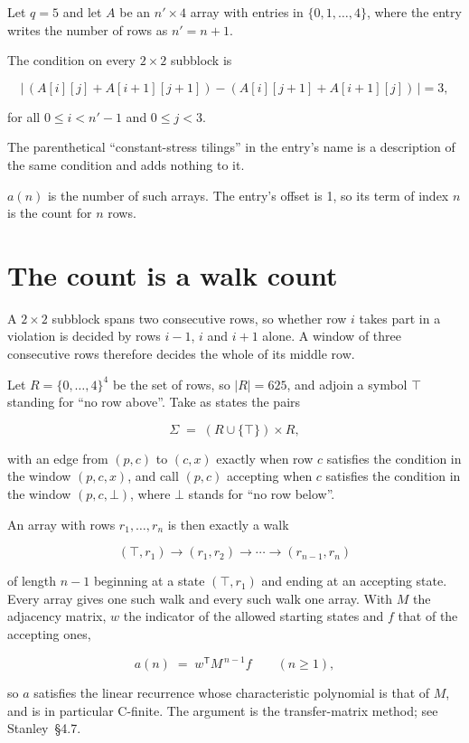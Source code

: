\documentclass[11pt]{article}
\theoremstyle{definition}
\begin{document}
Let $q = 5$ and let $A$ be an $n' \times 4$ array with entries in $\{0,1,\dots,4\}$, where the entry writes the number of rows as $n' = n + 1$.

The condition on every $2 \times 2$ subblock is

\[\bigl|\,(A[i][j] + A[i{+}1][j{+}1]) - (A[i][j{+}1] + A[i{+}1][j])\,\bigr| = 3,\]

for all $0 \le i < n'-1$ and $0 \le j < 3$.

The parenthetical ``constant-stress tilings'' in the entry's name is a description of the same condition and adds nothing to it.

$a(n)$ is the number of such arrays. The entry's offset is 1, so its term of index $n$ is the count for $n$ rows.

\section{The count is a walk count}

A $2 \times 2$ subblock spans two consecutive rows, so whether row $i$ takes part in a violation is decided by rows $i-1$, $i$ and $i+1$ alone. A window of three consecutive rows therefore decides the whole of its middle row.

Let $R = \{0,\dots,4\}^{4}$ be the set of rows, so $|R| = 625$, and adjoin a symbol $\top$ standing for ``no row above''. Take as states the pairs

\[\Sigma \;=\; (R \cup \{\top\}) \times R,\]

with an edge from $(p,c)$ to $(c,x)$ exactly when row $c$ satisfies the condition in the window $(p,c,x)$, and call $(p,c)$ accepting when $c$ satisfies the condition in the window $(p,c,\bot)$, where $\bot$ stands for ``no row below''.

An array with rows $r_1,\dots,r_n$ is then exactly a walk

\[(\top,r_1) \to (r_1,r_2) \to \cdots \to (r_{n-1},r_n)\]

of length $n-1$ beginning at a state $(\top,r_1)$ and ending at an accepting state. Every array gives one such walk and every such walk one array. With $M$ the adjacency matrix, $w$ the indicator of the allowed starting states and $f$ that of the accepting ones,

\[a(n) \;=\; w^{\mathsf T} M^{\,n-1} f \qquad (n \ge 1),\]

so $a$ satisfies the linear recurrence whose characteristic polynomial is that of $M$, and is in particular C-finite. The argument is the transfer-matrix method; see Stanley~\S4.7.
\end{document}
